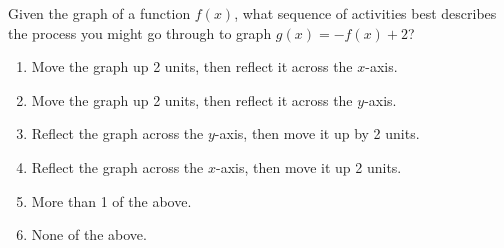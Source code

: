 \bigskip


\item Given the graph of a function $f(x)$, what sequence of activities best describes the process you might go through to graph $g(x) = -f(x)+2$?

\begin{enumerate}
\item Move the graph up 2 units, then reflect it across the $x$-axis.
\item Move the graph up 2 units, then reflect it across the $y$-axis.
\item Reflect the graph across the $y$-axis, then move it up by 2 units.
\item Reflect the graph across the $x$-axis, then move it up 2 units.
\item More than 1 of the above.
\item None of the above.
\end{enumerate}


